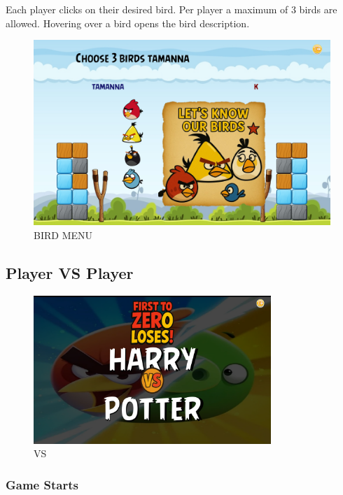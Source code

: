 \documentclass{article}
\begin{document}
Each player clicks on their desired bird. Per player a maximum of 3 birds are allowed.
Hovering over a bird opens the bird description.
\begin{figure}[h!]
    \centering
    \includegraphics[width = 1.0\textwidth]{choose_birds.png}
    \caption{BIRD MENU}
    \label{fig:BIRD_MENU}
\end{figure}

\subsection{Player VS Player}

\begin{figure}[h!]
    \centering
    \includegraphics[width = 0.80\textwidth]{VS.png}
    \caption{VS}
    \label{fig:VS}
\end{figure}



\subsubsection{Game Starts}
\end{document}
